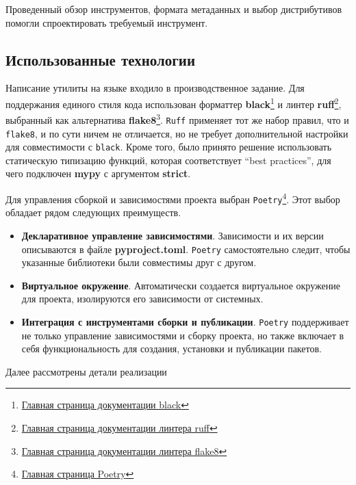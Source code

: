Проведенный обзор инструментов, формата метаданных и выбор дистрибутивов помогли спроектировать требуемый инструмент.

\subsection{Использованные технологии}
Написание утилиты на языке {\python} входило в производственное задание.
Для поддержания единого стиля кода использован форматтер \textbf{black}\footnote{\href{https://black.readthedocs.io/en/stable/}{Главная страница документации black}} и линтер \textbf{ruff}\footnote{\href{https://docs.astral.sh/ruff/}{Главная страница документации линтера ruff}}, выбранный как альтернатива \textbf{flake8}\footnote{\href{https://flake8.pycqa.org/en/latest/}{Главная страница документации линтера flake8}}.
\texttt{Ruff} применяет тот же набор правил, что и \texttt{flake8}, и по сути ничем не отличается, но не требует дополнительной настройки для совместимости с \texttt{black}.
Кроме того, было принято решение использовать статическую типизацию функций, которая соответствует \enquote{best practices}, для чего подключен \textbf{mypy} с аргументом \textbf{strict}.

Для управления сборкой и зависимостями проекта выбран \texttt{Poetry}\footnote{\href{https://python-poetry.org/}{Главная страница Poetry}}. Этот выбор обладает рядом следующих преимуществ.
\begin{itemize}
	\item \textbf{Декларативное управление зависимостями}. Зависимости и их версии описываются в файле \textbf{pyproject.toml}. \texttt{Poetry} самостоятельно следит, чтобы указанные библиотеки были совместимы друг с другом.
	\item \textbf{Виртуальное окружение}. Автоматически создается виртуальное окружение для проекта, изолируются его зависимости от системных.
	\item \textbf{Интеграция с инструментами сборки и публикации}. \texttt{Poetry} поддерживает не только управление зависимостями и сборку проекта, но также включает в себя функциональность для создания, установки и публикации пакетов.
\end{itemize}

Далее рассмотрены детали реализации

